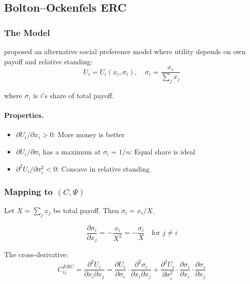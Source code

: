 \documentclass[12pt,a4paper]{article}
\begin{document}
\subsection{Bolton--Ockenfels ERC}
\label{app:boltonockenfels}

\subsubsection{The Model}

\citet{boltonockenfels} proposed an alternative social preference model
where utility depends on own payoff and relative standing:
\begin{equation}
  U_i = U_i\left(x_i, \sigma_i\right), \quad \sigma_i = \frac{x_i}{\sum_j x_j}
  \label{eq:ercutility}
\end{equation}

where $\sigma_i$ is $i$'s share of total payoff.

\paragraph{Properties.}
\begin{itemize}
  \item $\partial U_i / \partial x_i > 0$: More money is better
  \item $\partial U_i / \partial \sigma_i$ has a maximum at $\sigma_i = 1/n$: Equal share is ideal
  \item $\partial^2 U_i / \partial \sigma_i^2 < 0$: Concave in relative standing
\end{itemize}

\subsubsection{Mapping to $(C, \Psi)$}

Let $X = \sum_j x_j$ be total payoff. Then $\sigma_i = x_i / X$.

\begin{equation}
  \frac{\partial \sigma_i}{\partial x_j} = -\frac{x_i}{X^2} = -\frac{\sigma_i}{X}
  \quad \text{for } j \neq i
\end{equation}

The cross-derivative:
\begin{equation}
  C_{ij}^{ERC} = \frac{\partial^2 U_i}{\partial x_i \partial x_j}
               = \frac{\partial U_i}{\partial \sigma_i} \cdot \frac{\partial^2 \sigma_i}{\partial x_i \partial x_j}
               + \frac{\partial^2 U_i}{\partial \sigma_i^2} \cdot \frac{\partial \sigma_i}{\partial x_i} \cdot \frac{\partial \sigma_i}{\partial x_j}
\end{equation}
\end{document}
